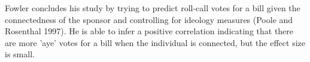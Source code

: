 Fowler concludes his study by trying to predict roll-call votes for a bill 
given the connectedness of the sponsor and controlling for ideology measures 
(Poole and Rosenthal 1997). He is able to infer a positive correlation 
indicating that there are more 'aye' votes for a bill when the individual is 
connected, but the effect size is small.
